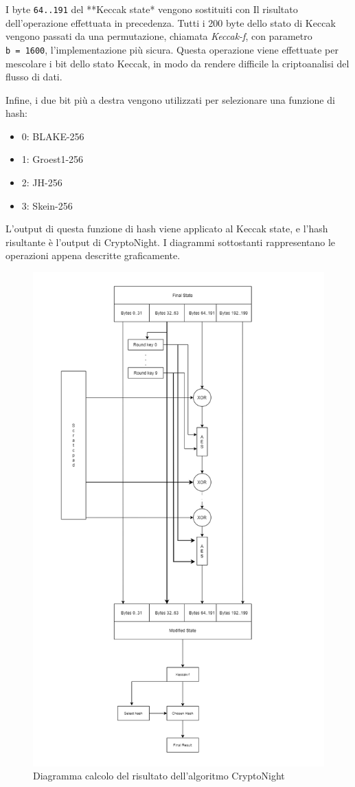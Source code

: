 I byte \texttt{64..191} del **Keccak state* vengono sostituiti con Il
risultato dell'operazione effettuata in precedenza. Tutti i 200 byte
dello stato di Keccak vengono passati da una permutazione, chiamata
\emph{Keccak-f}, con parametro \texttt{b\ =\ 1600}, l'implementazione
più sicura. Questa operazione viene effettuate per mescolare i bit dello
stato Keccak, in modo da rendere difficile la criptoanalisi del flusso
di dati.

Infine, i due bit più a destra vengono utilizzati per selezionare una
funzione di hash:

\begin{itemize}
  \item 
  0: BLAKE-256\cite{aumasson2008sha}
  \item
  1: Groest1-256\cite{groestl}
  \item 
  2: JH-256\cite{jh}
  \item 
  3: Skein-256\cite{skein}
\end{itemize}

L'output di questa funzione di hash viene applicato al Keccak state, e
l'hash risultante è l'output di CryptoNight. I diagrammi sottostanti rappresentano le operazioni
appena descritte graficamente.

\begin{figure}[h]
  \centering
  \includegraphics[width = 1\textwidth]{image_pt3.png}
  \caption{Diagramma calcolo del risultato dell'algoritmo CryptoNight}
  \label{fig:my_label}
\end{figure}